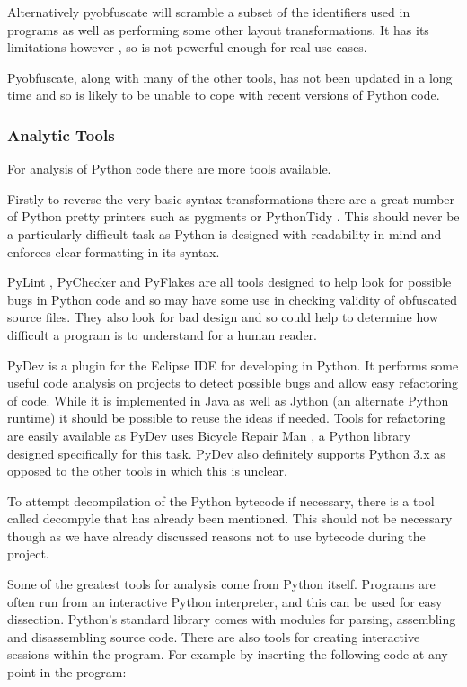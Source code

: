 \documentclass{report}
\begin{document}
Alternatively pyobfuscate \cite{pyobf} will scramble a subset of the identifiers used in programs as well as performing
some other layout transformations. It has its limitations however \cite{pyobf}, so is not powerful enough for real use cases.

Pyobfuscate, along with many of the other tools, has not been updated in a long time and so is likely to be unable to cope with
recent versions of Python code.

\subsubsection{Analytic Tools}

For analysis of Python code there are more tools available.

Firstly to reverse the very basic syntax transformations there are a great number of Python pretty printers such as
pygments \cite{pygments} or PythonTidy \cite{pythontidy}. This should never be a particularly difficult task as Python is
designed with readability in mind and enforces clear formatting in its syntax.

PyLint \cite{pylint}, PyChecker \cite{pychecker} and PyFlakes \cite{pyflakes} are all tools designed to help look for possible
bugs in Python code and so may have some use in checking validity of obfuscated source files. They also look for bad design and so
could help to determine how difficult a program is to understand for a human reader.

PyDev \cite{pydev} is a plugin for the Eclipse IDE for developing in Python. It performs some useful code analysis on projects to detect
possible bugs and allow easy refactoring of code. While it is implemented in Java as well as Jython (an alternate Python runtime)
it should be possible to reuse the ideas if needed. Tools for refactoring are easily available as PyDev uses Bicycle Repair
Man \cite{bikerepair}, a Python library designed specifically for this task. PyDev also definitely supports Python 3.x as opposed to the
other tools in which this is unclear.

To attempt decompilation of the Python bytecode if necessary, there is a tool called decompyle \cite{decompyle} that has already been
mentioned. This should not be necessary though as we have already discussed reasons not to use bytecode during the project.

Some of the greatest  tools for analysis come from Python itself. Programs are often run from an interactive Python interpreter, and this
can be used for easy dissection. Python's standard library comes with modules for parsing, assembling and disassembling source code.
There are also tools for creating interactive sessions within the program. For example by inserting the following code at any point
in the program:
\end{document}
